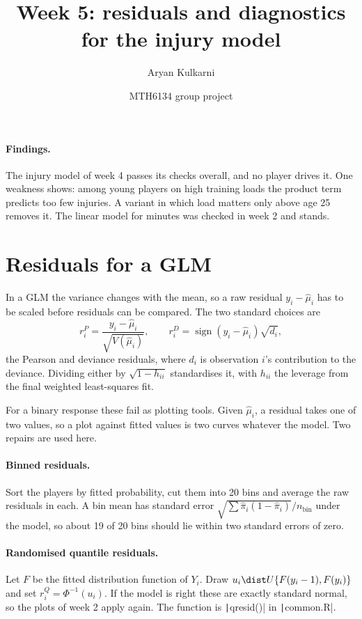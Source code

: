 \documentclass[12pt,notitlepage]{report}
\title{Week 5: residuals and diagnostics for the injury model}
\author{Aryan Kulkarni}
\date{MTH6134 group project}
\begin{document}
\maketitle

\paragraph{Findings.}
The injury model of week 4 passes its checks overall, and no player drives
it. One weakness shows: among young players on high training loads the
product term predicts too few injuries. A variant in which load matters only
above age 25 removes it. The linear model for minutes was checked in week 2
and stands.

\section{Residuals for a GLM}

In a GLM the variance changes with the mean, so a raw residual
$y_i - \hat\mu_i$ has to be scaled before residuals can be compared. The two
standard choices are
\[
  r^P_i = \frac{y_i - \hat\mu_i}{\sqrt{V(\hat\mu_i)}},
  \qquad
  r^D_i = \operatorname{sign}(y_i - \hat\mu_i)\sqrt{d_i},
\]
the Pearson and deviance residuals, where $d_i$ is observation $i$'s
contribution to the deviance. Dividing either by $\sqrt{1 - h_{ii}}$
standardises it, with $h_{ii}$ the leverage from the final weighted
least-squares fit.

For a binary response these fail as plotting tools. Given $\hat\mu_i$, a
residual takes one of two values, so a plot against fitted values is two
curves whatever the model. Two repairs are used here.

\paragraph{Binned residuals.}
Sort the players by fitted probability, cut them into 20 bins and average the
raw residuals in each. A bin mean has standard error
$\sqrt{\sum \hat\pi_i(1 - \hat\pi_i)}/n_{\text{bin}}$ under the model, so
about 19 of 20 bins should lie within two standard errors of zero.

\paragraph{Randomised quantile residuals.}
Let $F$ be the fitted distribution function of $Y_i$. Draw
$u_i \dist U\{F(y_i - 1), F(y_i)\}$ and set $r^Q_i = \Phi^{-1}(u_i)$. If the
model is right these are exactly standard normal, so the plots of week 2
apply again. The function is \texttt|qresid()| in
\texttt|common.R|.
\end{document}
